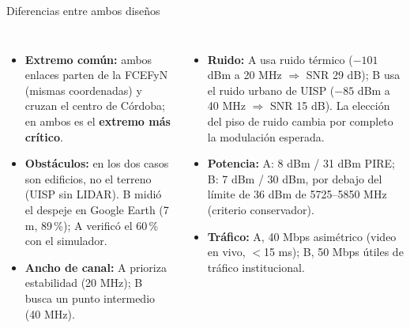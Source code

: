 \begin{frame}{Diferencias entre ambos diseños}
  \small
  \begin{columns}[T]
    \begin{itemize}
      \item \textbf{Extremo común:} ambos enlaces parten de la FCEFyN (mismas coordenadas) y
            cruzan el centro de Córdoba; en ambos es el \textbf{extremo más crítico}.
      \item \textbf{Obstáculos:} en los dos casos son edificios, no el terreno (UISP sin LIDAR).
            B midió el despeje en Google Earth (7 m, 89\,\%); A verificó el 60\,\% con el simulador.
      \item \textbf{Ancho de canal:} A prioriza estabilidad (20 MHz); B busca un punto
            intermedio (40 MHz).
    \end{itemize}
    \begin{itemize}
      \item \textbf{Ruido:} A usa ruido térmico ($-101$ dBm a 20 MHz $\Rightarrow$ SNR 29 dB);
            B usa el ruido urbano de UISP ($-85$ dBm a 40 MHz $\Rightarrow$ SNR 15 dB). La
            elección del piso de ruido cambia por completo la modulación esperada.
      \item \textbf{Potencia:} A: 8 dBm / 31 dBm PIRE; B: 7 dBm / 30 dBm, por debajo del
            límite de 36 dBm de 5725--5850 MHz (criterio conservador).
      \item \textbf{Tráfico:} A, 40 Mbps asimétrico (video en vivo, $<$15 ms);
            B, 50 Mbps útiles de tráfico institucional.
    \end{itemize}
  \end{columns}
\end{frame}
